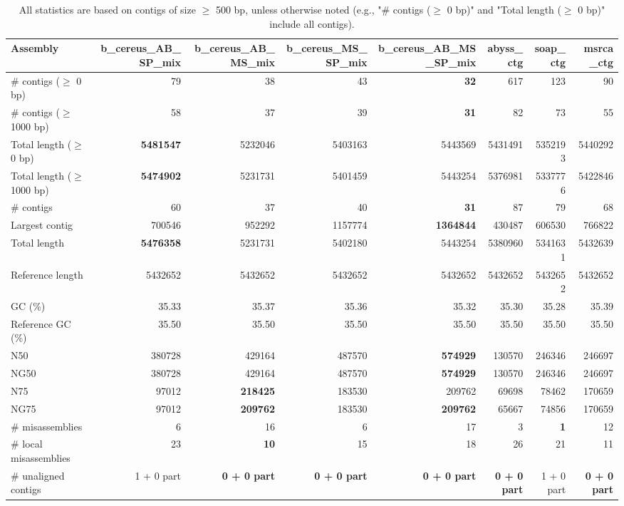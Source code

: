 \documentclass[12pt,a4paper]{article}
\begin{document}
\begin{table}[ht]
\begin{center}
\caption{All statistics are based on contigs of size $\geq$ 500 bp, unless otherwise noted (e.g., "\# contigs ($\geq$ 0 bp)" and "Total length ($\geq$ 0 bp)" include all contigs).}
\begin{tabular}{|l*{7}{|r}|}
\hline
Assembly & b\_cereus\_AB\_SP\_mix & b\_cereus\_AB\_MS\_mix & b\_cereus\_MS\_SP\_mix & b\_cereus\_AB\_MS\_SP\_mix & abyss\_ctg & soap\_ctg & msrca\_ctg \\ \hline
\# contigs ($\geq$ 0 bp) & 79 & 38 & 43 & {\bf 32} & 617 & 123 & 90 \\ \hline
\# contigs ($\geq$ 1000 bp) & 58 & 37 & 39 & {\bf 31} & 82 & 73 & 55 \\ \hline
Total length ($\geq$ 0 bp) & {\bf 5481547} & 5232046 & 5403163 & 5443569 & 5431491 & 5352193 & 5440292 \\ \hline
Total length ($\geq$ 1000 bp) & {\bf 5474902} & 5231731 & 5401459 & 5443254 & 5376981 & 5337776 & 5422846 \\ \hline
\# contigs & 60 & 37 & 40 & {\bf 31} & 87 & 79 & 68 \\ \hline
Largest contig & 700546 & 952292 & 1157774 & {\bf 1364844} & 430487 & 606530 & 766822 \\ \hline
Total length & {\bf 5476358} & 5231731 & 5402180 & 5443254 & 5380960 & 5341631 & 5432639 \\ \hline
Reference length & 5432652 & 5432652 & 5432652 & 5432652 & 5432652 & 5432652 & 5432652 \\ \hline
GC (\%) & 35.33 & 35.37 & 35.36 & 35.32 & 35.30 & 35.28 & 35.39 \\ \hline
Reference GC (\%) & 35.50 & 35.50 & 35.50 & 35.50 & 35.50 & 35.50 & 35.50 \\ \hline
N50 & 380728 & 429164 & 487570 & {\bf 574929} & 130570 & 246346 & 246697 \\ \hline
NG50 & 380728 & 429164 & 487570 & {\bf 574929} & 130570 & 246346 & 246697 \\ \hline
N75 & 97012 & {\bf 218425} & 183530 & 209762 & 69698 & 78462 & 170659 \\ \hline
NG75 & 97012 & {\bf 209762} & 183530 & {\bf 209762} & 65667 & 74856 & 170659 \\ \hline
\# misassemblies & 6 & 16 & 6 & 17 & 3 & {\bf 1} & 12 \\ \hline
\# local misassemblies & 23 & {\bf 10} & 15 & 18 & 26 & 21 & 11 \\ \hline
\# unaligned contigs & 1 + 0 part & {\bf 0 + 0 part} & {\bf 0 + 0 part} & {\bf 0 + 0 part} & {\bf 0 + 0 part} & 1 + 0 part & {\bf 0 + 0 part} \\ \hline

\end{tabular}
\end{center}
\end{table}
\end{document}
